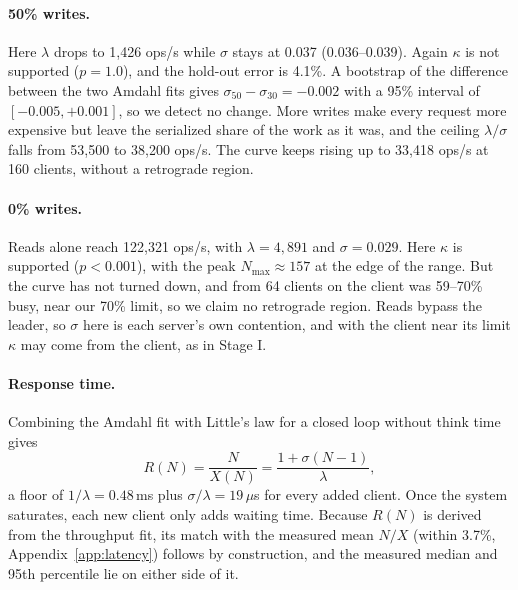 \documentclass{llncs}
\begin{document}
\paragraph{50\% writes.} Here $\lambda$ drops to 1{,}426 ops/s while $\sigma$ stays at 0.037 (0.036--0.039). Again $\kappa$ is not supported ($p=1.0$), and the hold-out error is 4.1\%. A bootstrap of the difference between the two Amdahl fits gives $\sigma_{50}-\sigma_{30}=-0.002$ with a 95\% interval of $[-0.005, +0.001]$, so we detect no change. More writes make every request more expensive but leave the serialized share of the work as it was, and the ceiling $\lambda/\sigma$ falls from 53{,}500 to 38{,}200 ops/s. The curve keeps rising up to 33{,}418 ops/s at 160 clients, without a retrograde region.

\paragraph{0\% writes.} Reads alone reach 122{,}321 ops/s, with $\lambda=4{,}891$ and $\sigma=0.029$. Here $\kappa$ is supported ($p<0.001$), with the peak $N_{\max}\approx157$ at the edge of the range. But the curve has not turned down, and from 64 clients on the client was 59--70\% busy, near our 70\% limit, so we claim no retrograde region. Reads bypass the leader, so $\sigma$ here is each server's own contention, and with the client near its limit $\kappa$ may come from the client, as in Stage I.

\paragraph{Response time.} Combining the Amdahl fit with Little's law for a closed loop without think time gives
\begin{equation}
  R(N)=\frac{N}{X(N)}=\frac{1+\sigma(N-1)}{\lambda},
\end{equation}
a floor of $1/\lambda=0.48$\,ms plus $\sigma/\lambda=19\,\mu$s for every added client. Once the system saturates, each new client only adds waiting time. Because $R(N)$ is derived from the throughput fit, its match with the measured mean $N/X$ (within 3.7\%, Appendix~\ref{app:latency}) follows by construction, and the measured median and 95th percentile lie on either side of it.
\end{document}
